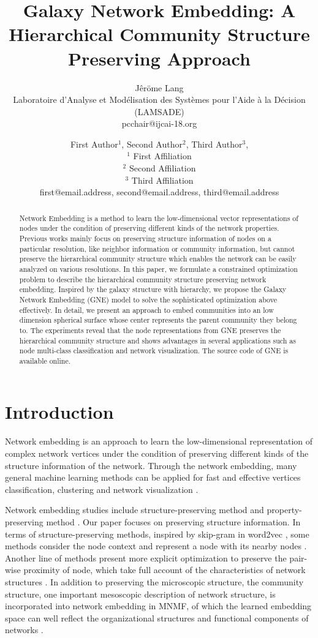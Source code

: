 \documentclass{article}
\title{Galaxy Network Embedding: A Hierarchical Community Structure Preserving Approach}
\author{Jêröme Lang\\ 
Laboratoire d'Analyse et Modélisation des Systèmes pour l'Aide à la Décision (LAMSADE)  \\
pcchair@ijcai-18.org}
\author{
First Author$^1$, 
Second Author$^2$, 
Third Author$^3$, 
\\ 
$^1$ First Affiliation \\
$^2$ Second Affiliation\\
$^3$ Third Affiliation  \\
%
first@email.address,
second@email.address,
third@email.address
}
\theoremstyle{definition}
\begin{document}
\maketitle

\begin{abstract}
	Network Embedding is a method to learn the low-dimensional vector representations of nodes under the condition of preserving different kinds of the network properties. Previous works mainly focus on preserving structure information of nodes on a particular resolution, like neighbor information or community information, but cannot preserve the hierarchical community structure which enables the network can be easily analyzed on various resolutions. In this paper, we formulate a constrained optimization problem to describe the hierarchical community structure preserving network embedding. Inspired by the galaxy structure with hierarchy, we propose the Galaxy Network Embedding (GNE) model to solve the sophisticated optimization above effectively. In detail, we present an approach to embed communities into an low dimension spherical surface whose center represents the parent community they belong to. The experiments reveal that the node representations from GNE preserves the hierarchical community structure and shows advantages in several applications such as node multi-class classification and network visualization. The source code of GNE is available online.

\end{abstract}

\section{Introduction}

		Network embedding is an approach to learn the low-dimensional representation of complex network vertices under the condition of preserving different kinds of the structure information of the network. Through the network embedding, many general machine learning methods can be applied for fast and effective vertices classification, clustering and network visualization \cite{bhagat2011node}\cite{yan2007graph}.
		
		Network embedding studies include structure-preserving method \cite{Grover2016node2vec}\cite{Wang2017Community} and property-preserving method \cite{Yang2015Network}\cite{Hu2017Label}. Our paper focuses on preserving structure information. In terms of structure-preserving methods, inspired by skip-gram in word2vec \cite{mikolov2013efficient}, some methods consider the node context and represent a node with its nearby nodes \cite{Perozzi2014DeepWalk}\cite{Grover2016node2vec}. Another line of methods present more explicit optimization to preserve the pair-wise proximity of node, which take full account of the characteristics of network structures \cite{Tang2015LINE}\cite{Cao2015GraRep}\cite{Wang2016Structural}. In addition to preserving the microscopic structure, the community structure, one important mesoscopic description of network structure, is incorporated into network embedding in MNMF, of which the learned embedding space can well reflect the organizational structures and functional components of networks \cite{Wang2017Community}.
\end{document}
